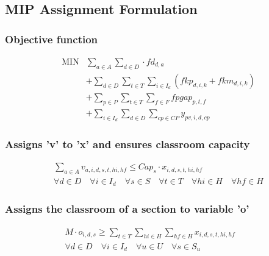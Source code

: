 
\subsection{MIP  Assignment Formulation}


\subsubsection{Objective function}
$$
\begin{array}{rl}
   \mbox{MIN} &
			\sum\limits_{a \in A}\sum\limits_{d \in D} \cdot fd_{d,a}
      \\
      &
       + \sum\limits_{d \in D} 
\sum\limits_{t \in T} \sum\limits_{i \in I_{d}} (fkp_{d,i,k} + fkm_{d,i,k})
      \\
      &
      + \sum\limits_{p \in P} \sum\limits_{t \in T} \sum\limits_{f \in F} fpgap_{p,t,f}
      \\
      &
      + \sum\limits_{i \in I_{d}} \sum\limits_{d \in D} \sum\limits_{cp \in CP} y_{pv,i,d,cp}
\end{array}
$$




\subsubsection{Assigns 'v' to 'x' and ensures classroom capacity}
\begin{eqnarray}
\sum\limits_{a \in A} v_{a,i,d,s,t,hi,hf}  \le Cap_{s} \cdot x_{i,d,s,t,hi,hf} \nonumber \qquad 
\\
\forall d \in D \quad
\forall i \in I_{d} \quad 
\forall s \in S \quad
\forall t \in T \quad 
\forall hi \in H \quad 
\forall hf \in H
\end{eqnarray}

\subsubsection{Assigns the classroom of a section to variable 'o'}
\begin{eqnarray}
M \cdot o_{i,d,s}  \geq \sum\limits_{t \in T}\sum\limits_{hi \in H}\sum\limits_{hf \in H} x_{i,d,s,t,hi,hf}  \nonumber \qquad 
\\
\forall d \in D \quad
\forall i \in I_{d} \quad
\forall u \in U \quad
\forall s \in S_{u} \quad
\end{eqnarray}

